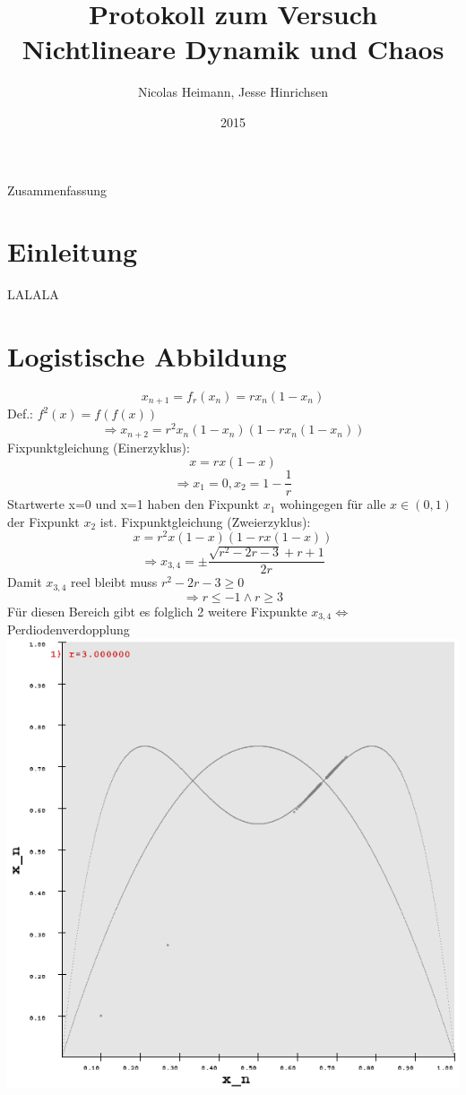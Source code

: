 \documentclass{scrartcl}
\title{Protokoll zum Versuch Nichtlineare Dynamik und Chaos}
\author{Nicolas Heimann, Jesse Hinrichsen}
\affil{\textit{Universität Hamburg}}
\date{2015}
\begin{document}
\maketitle




\begin{description}
\item Zusammenfassung
\end{description}


\section{  Einleitung  }
LALALA

\section{Logistische Abbildung}
$$x_{n+1}=f_r(x_n)=rx_n(1-x_n)$$
Def.: $f^2(x) = f(f(x))$
$$\Rightarrow x_{n+2}=r^2x_n(1-x_n)(1-rx_n(1-x_n))$$
\newline
Fixpunktgleichung (Einerzyklus): 
$$x=rx(1-x)$$
$$\Rightarrow x_1=0, x_2=1-\frac{1}{r}$$
Startwerte x=0 und x=1 haben den Fixpunkt $x_1$ wohingegen für alle $x\in (0,1)$ der Fixpunkt $x_2$ ist.
\newline
Fixpunktgleichung (Zweierzyklus):
$$x=r^2x(1-x)(1-rx(1-x))$$
$$\Rightarrow x_{3,4}=\pm\frac{\sqrt{r^2-2 r-3}+r+1}{2 r}$$
Damit $x_{3,4}$ reel bleibt muss $r^2-2 r-3 \geq 0$
$$\Rightarrow r \leq -1 \land r \geq 3$$
Für diesen Bereich gibt es folglich 2 weitere Fixpunkte $x_{3,4} \Leftrightarrow$ Perdiodenverdopplung 
\newline
\includegraphics[scale=0.3]{r3}
\end{document}
